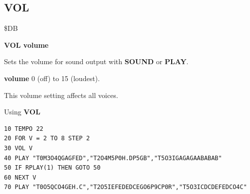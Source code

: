 \subsection{VOL}
\begin{description}[leftmargin=2cm,style=nextline]
\item [Token:] \$DB
\item [Format:] {\bf VOL volume}
\item [Usage:] Sets the volume for sound output with
               {\bf SOUND} or {\bf PLAY}.

               {\bf volume} 0 (off) to 15 (loudest).

\item [Remarks:] This volume setting affects all voices.

\item [Example:] Using {\bf VOL}
\begin{tcolorbox}[colback=black,coltext=white]
\verbatimfont{\codefont}
\begin{verbatim}
10 TEMPO 22
20 FOR V = 2 TO 8 STEP 2
30 VOL V
40 PLAY "T0M3O4QGAGFED","T2O4M5P0H.DP5GB","T5O3IGAGAGAABABAB"
50 IF RPLAY(1) THEN GOTO 50
60 NEXT V
70 PLAY "T0O5QCO4GEH.C","T2O5IEFEDEDCEGO6P9CP0R","T5O3ICDCDEFEDCO4C"
\end{verbatim}
\end{tcolorbox}
\end{description}


\newpage
